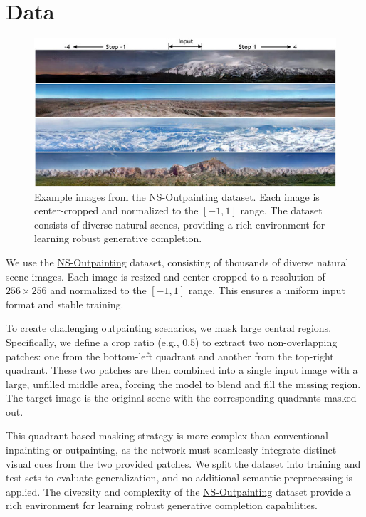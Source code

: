 \documentclass[sigconf]{acmart}
\begin{document}
\section{Data}

\begin{figure}[h!]
    \centering
    \includegraphics[width=\linewidth]{images/ns_dataset.jpg}
    \caption{Example images from the NS-Outpainting dataset. Each image is center-cropped and normalized to the $[-1,1]$ range. The dataset consists of diverse natural scenes, providing a rich environment for learning robust generative completion.}
    \label{fig:ns_dataset}
\end{figure}

We use the \textcolor{red}{\href{https://github.com/z-x-yang/NS-Outpainting}{NS-Outpainting}} dataset, consisting of thousands of diverse natural scene images. Each image is resized and center-cropped to a resolution of $256 \times 256$ and normalized to the $[-1,1]$ range. This ensures a uniform input format and stable training.

To create challenging outpainting scenarios, we mask large central regions. Specifically, we define a crop ratio (e.g., $0.5$) to extract two non-overlapping patches: one from the bottom-left quadrant and another from the top-right quadrant. These two patches are then combined into a single input image with a large, unfilled middle area, forcing the model to blend and fill the missing region. The target image is the original scene with the corresponding quadrants masked out.

This quadrant-based masking strategy is more complex than conventional inpainting or outpainting, as the network must seamlessly integrate distinct visual cues from the two provided patches. We split the dataset into training and test sets to evaluate generalization, and no additional semantic preprocessing is applied. The diversity and complexity of the \textcolor{red}{\href{https://github.com/z-x-yang/NS-Outpainting}{NS-Outpainting}} dataset provide a rich environment for learning robust generative completion capabilities.
\end{document}
